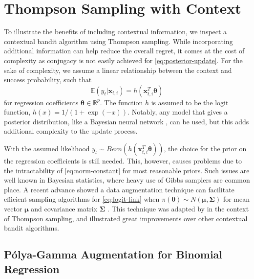 \documentclass[12pt]{article}
\begin{document}
\section{Thompson Sampling with Context} \label{sec:pgts}

To illustrate the benefits of including contextual information, we inspect a 
contextual bandit algorithm using Thompson sampling.
While incorporating additional information can help reduce the overall regret, 
it comes at the cost of complexity as conjugacy is not easily achieved for 
\eqref{eq:posterior-update}.
For the sake of complexity, we assume a linear relationship between the context 
and success probability, such that
\begin{equation}
\mathbb{E}(y_t \vert \bm{x}_{t,i}) = h(\bm{x}_{t,i}^T \bm{\theta})
\label{eq:logit-link}
\end{equation}
for regression coefficients $\bm{\theta} \in \mathbb{R}^p$. 
The function $h$ is assumed to be the logit function, 
$h(x) = 1 / (1 + \exp(-x))$.
Notably, any model that gives a posterior distribution, like a Bayesian neural 
network \cite{riquelme2018deep}, can be used, but this adds additional complexity 
to the update process.

With the assumed likelihood $y_t \sim Bern(h(\bm{x}_{t,i}^T \bm{\theta}))$, the
choice for the prior on the regression coefficients is still needed.
This, however, causes problems due to the intractability of \eqref{eq:norm-constant}
for most reasonable priors.
Such issues are well known in Bayesian statistics, where heavy use of Gibbs 
samplers are common place.
A recent advance showed a data augmentation technique can facilitate efficient
sampling algorithms for \eqref{eq:logit-link} when 
$\pi(\bm{\theta}) \sim N(\bm{\mu}, \bm{\Sigma})$ 
for mean vector $\bm{\mu}$ and covariance matrix $\bm{\Sigma}$ 
\cite{polson2013bayesian}.
This technique was adapted by \cite{dumitrascu2018pg} in the context of Thompson 
sampling, and illustrated great improvements over other contextual bandit 
algorithms.

\subsection{P\'olya-Gamma Augmentation for Binomial Regression}
\end{document}
